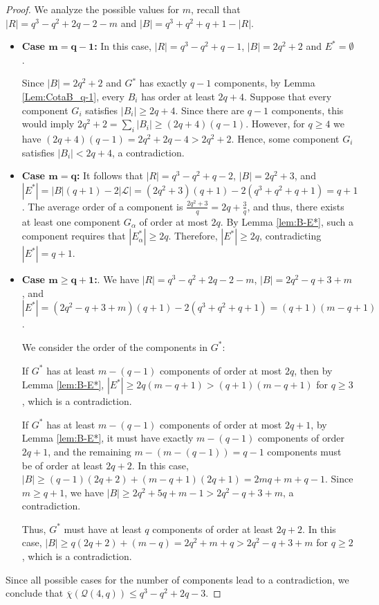 \documentclass[12pt]{article}
\begin{document}
\begin{proof}
We analyze the possible values for $m$, recall that $|R| = q^3 - q^2 + 2q - 2 - m$ and $|B| = q^3+q^2 +q+ 1-|R|$.

\begin{itemize}
\item {\bf{Case $\mathbf{m = q - 1}$:}}
In this case, $|R| = q^3 - q^2 + q - 1$,  $|B| = 2q^2 + 2$ and $E^* =\emptyset$.

Since $|B|=2q^2+2$ and $G{^*}$ has {exactly}  $q-1$ components, {by Lemma \ref{Lem:CotaB_q-1},} every $B_i$ has order at least $2q+4$.
Suppose that every component $G_i$ satisfies $|B_i|\geq 2q+4$.
{Since there are $q-1$ components, this would imply $2q^2+2=\sum_i |B_i| \geq (2q+4)(q-1).$
However, for $q\geq 4$ we have $(2q+4)(q-1)=2q^2+2q-4>2q^2+2$. Hence, some component $G_i$ satisfies $|B_i|<2q+4$, 
a contradiction.}  

\item {\bf{Case $\mathbf{m = q}$:}}
It follows that $|R| = q^3 - q^2 + q - 2$,   $|B| = 2q^2 + 3$, and $|E^*| = |B|(q+1) - 2|\mathcal{L}| = (2q^2+3)(q+1) - 2(q^3+q^2+q+1) = q + 1$.
The average order of a component is $\frac{2q^2+3}{q} = 2q + \frac{3}{q}$, and thus, there exists at least one component $G_\alpha$ of order at most $2q$. By Lemma \ref{lem:B-E*}, such a component requires that $|E^*_\alpha|\ge2q$. Therefore, $|E^*| \ge 2q$, contradicting  $|E^*| = q + 1$.

\item {\bf{Case $\mathbf{m \ge q + 1}$:}}.
We have $|R| {=} q^3 - q^2 + 2q - 2 - m$, $|B| {=} 2q^2 - q + 3 + m$, and $|E^*| {=} (2q^2 - q + 3 + m)(q+1) - 2(q^3+q^2+q+1) = (q+1)(m - q + 1)$.

We consider the order of the components in $G^*$:

If $G^*$ has at least $m - (q-1)$ components of order at most $2q$, then by Lemma \ref{lem:B-E*}, $|E^*| \ge 2q(m - q + 1) > (q+1)(m - q + 1)$ for $q \ge 3$, which is a contradiction.

If $G^*$ has at least $m - (q-1)$ components of order at most $2q+1$, by {Lemma \ref{lem:B-E*}}, it must have exactly $m - (q-1)$ components of order $2q+1$, and the remaining $m - (m - (q-1)) = q - 1$ components must be of order at least $2q+2$. 
In this case, $|B| \ge (q-1)(2q+2) + (m - q + 1)(2q+1) = 2mq + m + q - 1$. 
Since $m \ge q + 1$, we have $|B| \ge 2q^2 + 5q + m - 1 > 2q^2 - q + 3 + m$, a contradiction.
 
Thus, $G^*$ must have at least $q$ components of order at least $2q+2$. In this case, 
    $|B| \ge q(2q+2) + (m - q) = 2q^2 + m + q > 2q^2 - q + 3 + m$ for $q \ge {2}$, which is a contradiction.
    
\end{itemize}
%
Since all possible cases for the number of components lead to a contradiction, we conclude that $\overline{\chi}(\mathcal{Q}(4,q)) \leq q^3 - q^2  +2q -3.$
\end{proof}
\end{document}
